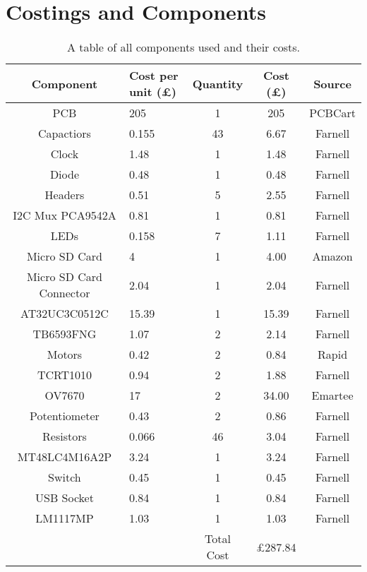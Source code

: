 \chapter{Costings and Components} \label{Appendix:Costings}

\begin{table}
\centering
\caption{A table of all components used and their costs.}
\label{table:Costings}
\begin{tabular}{cp{2cm}ccc} \toprule
\textbf{Component}	&	\textbf{Cost per unit} (\pounds)	& \textbf{Quantity} 	&	\textbf{Cost} (\pounds)		&	\textbf{Source}		\\ \toprule
PCB			&	205						&	1		&	205					&	PCBCart		\\ \midrule
Capactiors	&	0.155 					& 	43		& 	6.67 				& 	Farnell 	\\ \midrule
Clock 		& 	1.48					& 	1		&	1.48 				& 	Farnell		\\ \midrule
Diode		&	0.48					&	1		&	0.48				&	Farnell 	\\ \midrule
Headers		&	0.51 					&	5		&	2.55				&	Farnell 	\\ \midrule
I2C Mux PCA9542A &	0.81				&	1		&	0.81				&	Farnell		\\ \midrule
LEDs 		&	0.158					&	7		& 	1.11 				&	Farnell		\\ \midrule
Micro SD Card &	4						&	1		&	4.00 				&	Amazon 		\\ \midrule
Micro SD Card Connector & 2.04			&	1		&	2.04				&	Farnell		\\ \midrule
AT32UC3C0512C	&15.39					&	1		&	15.39				&	Farnell		\\ \midrule
TB6593FNG 	&	1.07 					&	2 		&	2.14 				&	Farnell 	\\ \midrule
Motors  	&	0.42					&	2		&	0.84				&	Rapid 		\\ \midrule
TCRT1010	& 	0.94 					&	2		&	1.88 				&	Farnell 	\\ \midrule
OV7670		&	17						&	2		&	34.00				& 	Emartee		\\ \midrule
Potentiometer	&	0.43				&	2		&	0.86				&	Farnell 	\\ \midrule
Resistors	&	0.066 					& 	46		&	3.04 				&	Farnell 	\\ \midrule
MT48LC4M16A2P	& 3.24  				& 	1		&	3.24 				&	Farnell		\\ \midrule
Switch		&	0.45					&	1		&	0.45				&	Farnell 	\\ \midrule
USB Socket	&	0.84 					&	1		& 	0.84 				&	Farnell 	\\ \midrule
LM1117MP	&	1.03					&	1		&	1.03	 			&	Farnell		\\  \bottomrule %
\multicolumn{2}{c}{ }					& Total Cost  & \pounds 287.84		&	\multicolumn{1}{c}{ }			\\ \cmidrule{3-4}
\end{tabular}
\end{table}


